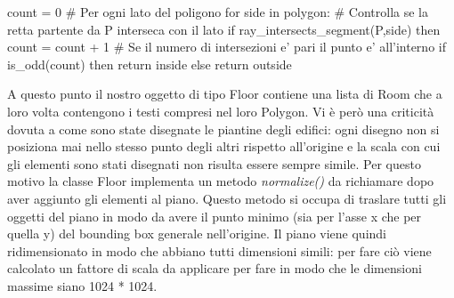 \documentclass[12pt]{report}
\begin{document}
\begin{python}[title=Ray casting algorithm in pseudocodice, frame=single]
count = 0
# Per ogni lato del poligono
for side in polygon:
# Controlla se la retta partente da P interseca con il lato
    if ray_intersects_segment(P,side) then
        count = count + 1
# Se il numero di intersezioni e' pari il punto e' all'interno
if is_odd(count) then    
    return inside
else
    return outside
\end{python}

\vspace{5mm} %

A questo punto il nostro oggetto di tipo Floor contiene una lista di Room che a loro volta contengono i testi compresi nel loro Polygon. 
Vi è però una criticità dovuta a come sono state disegnate le piantine degli edifici: ogni disegno non si posiziona mai nello stesso punto degli altri rispetto all'origine e la scala con cui gli elementi sono stati disegnati non risulta essere sempre simile. 
Per questo motivo la classe Floor implementa un metodo \textit{normalize()} da richiamare dopo aver aggiunto gli elementi al piano. 
Questo metodo si occupa di traslare tutti gli oggetti del piano in modo da avere il punto minimo (sia per l'asse x che per quella y) del bounding box generale nell'origine. 
Il piano viene quindi ridimensionato in modo che abbiano tutti dimensioni simili: per fare ciò viene calcolato un fattore di scala da applicare per fare in modo che le dimensioni massime siano 1024 * 1024.
\end{document}
